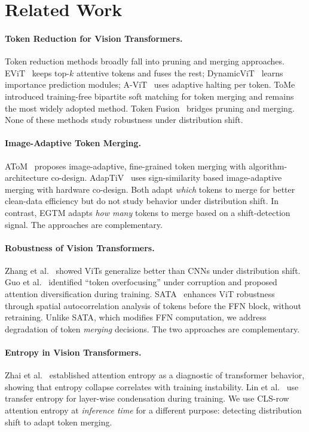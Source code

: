 \documentclass{article}
\newcommand{\ours}{EGTM}
\begin{document}
\section{Related Work}
\label{sec:related}

\paragraph{Token Reduction for Vision Transformers.}
Token reduction methods broadly fall into pruning and merging approaches. EViT~\citep{liang2022evit} keeps top-$k$ attentive tokens and fuses the rest; DynamicViT~\citep{rao2021dynamicvit} learns importance prediction modules; A-ViT~\citep{yin2022avit} uses adaptive halting per token. ToMe~\citep{bolya2023token} introduced training-free bipartite soft matching for token merging and remains the most widely adopted method. Token Fusion~\citep{kim2024token} bridges pruning and merging. None of these methods study robustness under distribution shift.

\paragraph{Image-Adaptive Token Merging.}
AToM~\citep{shin2025atom} proposes image-adaptive, fine-grained token merging with algorithm-architecture co-design. AdapTiV~\citep{yoo2024adaptiv} uses sign-similarity based image-adaptive merging with hardware co-design. Both adapt \emph{which} tokens to merge for better clean-data efficiency but do not study behavior under distribution shift. In contrast, \ours{} adapts \emph{how many} tokens to merge based on a shift-detection signal. The approaches are complementary.

\paragraph{Robustness of Vision Transformers.}
Zhang et al.~\citep{zhang2022delving} showed ViTs generalize better than CNNs under distribution shift. Guo et al.~\citep{guo2023robustifying} identified ``token overfocusing'' under corruption and proposed attention diversification during training. SATA~\citep{nikzad2025sata} enhances ViT robustness through spatial autocorrelation analysis of tokens before the FFN block, without retraining. Unlike SATA, which modifies FFN computation, we address degradation of token \emph{merging} decisions. The two approaches are complementary.

\paragraph{Entropy in Vision Transformers.}
Zhai et al.~\citep{zhai2023stabilizing} established attention entropy as a diagnostic of transformer behavior, showing that entropy collapse correlates with training instability. Lin et al.~\citep{lin2026entropy} use transfer entropy for layer-wise condensation during training. We use CLS-row attention entropy at \emph{inference time} for a different purpose: detecting distribution shift to adapt token merging.
\end{document}
